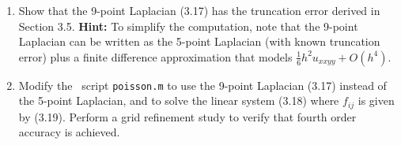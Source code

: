 

\begin{enumerate}
\item
Show that the 9-point Laplacian (3.17) has the truncation error derived in
Section 3.5.
{\bf Hint:} To simplify the computation, note that the 9-point Laplacian can
be written as the 5-point Laplacian (with known truncation error) plus a
finite difference approximation that models $\frac 1 6 h^2 u_{xxyy} +
O(h^4)$.

\item
Modify the \matlab\ script {\tt poisson.m} to use the
9-point Laplacian (3.17) instead of the 5-point Laplacian, and to solve the
linear system (3.18) where $f_{ij}$ is given by (3.19).  Perform a grid
refinement study to verify that fourth order accuracy is achieved.

\end{enumerate} 
